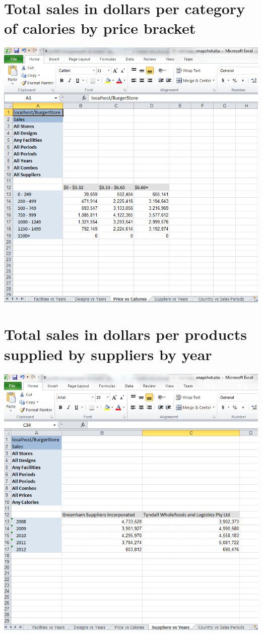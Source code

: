 \documentclass[12pt, a4paper]{article}
\begin{document}
\section{Total sales in dollars per category of calories by price bracket}
\includegraphics{diagrams/PriceVsCalories}

\section{Total sales in dollars per products supplied by suppliers by year}
\includegraphics{diagrams/SuppliersVsYears}
\end{document}
